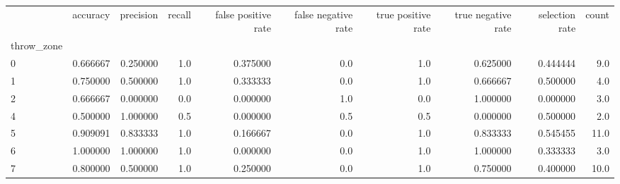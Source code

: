 \begin{tabular}{lrrrrrrrrr}
\toprule
{} &  accuracy &  precision &  recall &  false positive rate &  false negative rate &  true positive rate &  true negative rate &  selection rate &  count \\
throw\_zone &           &            &         &                      &                      &                     &                     &                 &        \\
\midrule
0          &  0.666667 &   0.250000 &     1.0 &             0.375000 &                  0.0 &                 1.0 &            0.625000 &        0.444444 &    9.0 \\
1          &  0.750000 &   0.500000 &     1.0 &             0.333333 &                  0.0 &                 1.0 &            0.666667 &        0.500000 &    4.0 \\
2          &  0.666667 &   0.000000 &     0.0 &             0.000000 &                  1.0 &                 0.0 &            1.000000 &        0.000000 &    3.0 \\
4          &  0.500000 &   1.000000 &     0.5 &             0.000000 &                  0.5 &                 0.5 &            0.000000 &        0.500000 &    2.0 \\
5          &  0.909091 &   0.833333 &     1.0 &             0.166667 &                  0.0 &                 1.0 &            0.833333 &        0.545455 &   11.0 \\
6          &  1.000000 &   1.000000 &     1.0 &             0.000000 &                  0.0 &                 1.0 &            1.000000 &        0.333333 &    3.0 \\
7          &  0.800000 &   0.500000 &     1.0 &             0.250000 &                  0.0 &                 1.0 &            0.750000 &        0.400000 &   10.0 \\
\bottomrule
\end{tabular}
